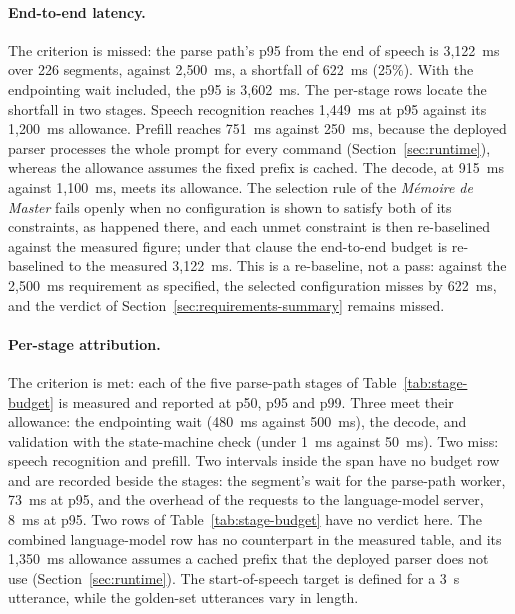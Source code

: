 \paragraph{End-to-end latency.} The criterion is missed: the parse path's p95 from the end of
speech is 3{,}122~ms over 226 segments, against 2{,}500~ms, a shortfall of 622~ms (25\%). With the
endpointing wait included, the p95 is 3{,}602~ms. The per-stage rows locate the shortfall in two
stages. Speech recognition reaches 1{,}449~ms at p95 against its 1{,}200~ms allowance. Prefill
reaches 751~ms against 250~ms, because the deployed parser processes the whole prompt for every
command (Section~\ref{sec:runtime}), whereas the allowance assumes the fixed prefix is cached. The
decode, at 915~ms against 1{,}100~ms, meets its allowance. The selection rule of the
\emph{M\'emoire de Master} fails openly when no configuration is shown to satisfy both of its
constraints, as happened there, and each unmet constraint is then re-baselined against the measured
figure; under that clause the end-to-end budget is re-baselined to the measured 3{,}122~ms. This is a
re-baseline, not a pass: against the 2{,}500~ms requirement as specified, the selected
configuration misses by 622~ms, and the verdict of Section~\ref{sec:requirements-summary} remains
missed.

\paragraph{Per-stage attribution.} The criterion is met: each of the five parse-path stages of
Table~\ref{tab:stage-budget} is measured and reported at p50, p95 and p99. Three meet their
allowance: the endpointing wait (480~ms against 500~ms), the decode, and validation with the
state-machine check (under 1~ms against 50~ms). Two miss: speech recognition and prefill. Two
intervals inside the span have no budget row and are recorded beside the stages: the segment's
wait for the parse-path worker, 73~ms at p95, and the overhead of the requests to the
language-model server, 8~ms at p95. Two rows of Table~\ref{tab:stage-budget} have no verdict here.
The combined language-model row has no counterpart in the measured table, and its 1{,}350~ms allowance
assumes a cached prefix that the deployed parser does not use (Section~\ref{sec:runtime}). The
start-of-speech target is defined for a 3~s utterance, while the golden-set utterances vary in length.

